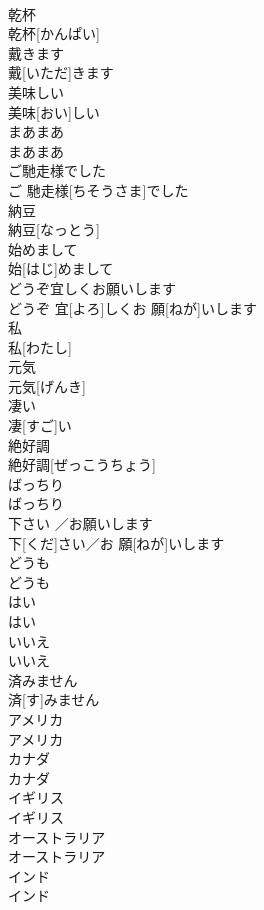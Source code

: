 \documentclass[8pt]{extreport}
\begin{document}
\begin{CJK}{UTF8}{min}
\\	乾杯	
\\	乾杯[かんぱい]
\\	戴きます	
\\	戴[いただ]きます
\\	美味しい	
\\	美味[おい]しい
\\	まあまあ	
\\	まあまあ
\\	ご馳走様でした	
\\	ご 馳走様[ちそうさま]でした
\\	納豆	
\\	納豆[なっとう]
\\	始めまして	
\\	始[はじ]めまして
\\	どうぞ宜しくお願いします	
\\	どうぞ 宜[よろ]しくお 願[ねが]いします
\\	私	
\\	私[わたし]
\\	元気	
\\	元気[げんき]
\\	凄い	
\\	凄[すご]い
\\	絶好調	
\\	絶好調[ぜっこうちょう]
\\	ばっちり	
\\	ばっちり
\\	下さい ／お願いします	
\\	下[くだ]さい／お 願[ねが]いします
\\	どうも	
\\	どうも
\\	はい	
\\	はい
\\	いいえ	
\\	いいえ
\\	済みません	
\\	済[す]みません
\\	アメリカ	
\\	アメリカ
\\	カナダ	
\\	カナダ
\\	イギリス	
\\	イギリス
\\	オーストラリア	
\\	オーストラリア
\\	インド	
\\	インド

\end{CJK}
\end{document}
